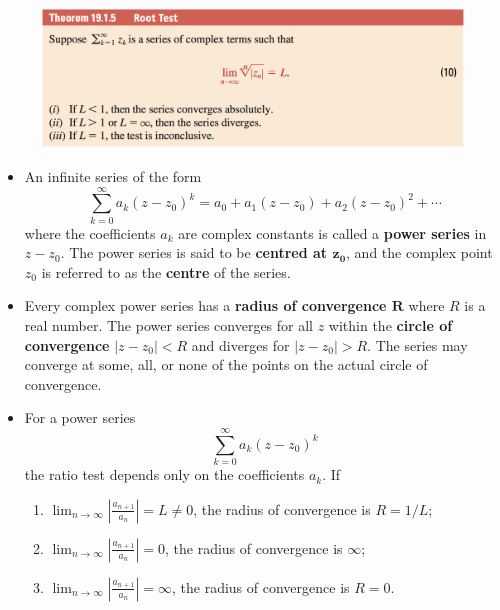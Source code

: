 \documentclass{article}
\begin{document}
\begin{figure}[H]
  \centering
  \includegraphics[width=\textwidth]{root-test}
\end{figure}

\begin{itemize}
  \item An infinite series of the form \[\sum_{k = 0}^\infty a_k (z - z_0)^k = a_0 + a_1 (z - z_0) + a_2 (z - z_0)^2 + \cdots\] where the coefficients $a_k$ are complex constants is called a \textbf{power series} in $z - z_0$. The power series is said to be \textbf{centred at $\boldsymbol{z_0}$}, and the complex point $z_0$ is referred to as the \textbf{centre} of the series.

  \item Every complex power series has a \textbf{radius of convergence $\boldsymbol{R}$} where $R$ is a real number. The power series converges for all $z$ within the \textbf{circle of convergence} $|z - z_0| < R$ and diverges for $|z - z_0| > R$. The series may converge at some, all, or none of the points on the actual circle of convergence.

  \item For a power series \[\sum_{k = 0}^\infty a_k (z - z_0)^k\] the ratio test depends only on the coefficients $a_k$. If \begin{enumerate}
          \item $\lim_{n \rightarrow \infty} \left| \frac{a_{n + 1}}{a_n} \right| = L \ne 0$, the radius of convergence is $R = 1 / L$;

          \item $\lim_{n \rightarrow \infty} \left| \frac{a_{n + 1}}{a_n} \right| = 0$, the radius of convergence is $\infty$;

          \item $\lim_{n \rightarrow \infty} \left| \frac{a_{n + 1}}{a_n} \right| = \infty$, the radius of convergence is $R = 0$.
        \end{enumerate}
\end{itemize}
\end{document}
